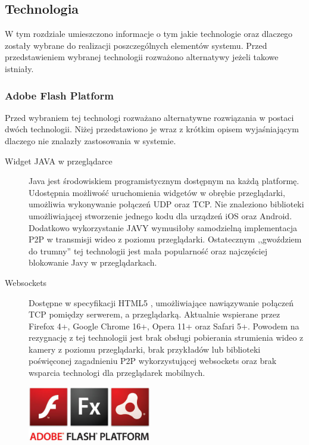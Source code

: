 \subsection{Technologia}
\label{sec:EtapItechnologia}

W tym rozdziale umieszczono informacje o tym jakie technologie oraz dlaczego zostały wybrane do realizacji poszczególnych elementów systemu. Przed przedstawieniem wybranej technologii rozważono alternatywy jeżeli takowe istniały.

\subsubsection{Adobe Flash Platform}
\label{sec:EtapItechnologiaAFP}

Przed wybraniem tej technologi rozważano alternatywne rozwiązania w postaci dwóch technologii. Niżej przedstawiono je wraz z krótkim opisem wyjaśniającym dlaczego nie znalazły zastosowania w systemie.
\begin{description}
    \item[Widget JAVA w przeglądarce] Java jest środowiskiem programistycznym dostępnym na każdą platformę. Udostępnia możliwość uruchomienia widgetów w obrębie przeglądarki, umożliwia wykonywanie połączeń UDP oraz TCP. Nie znaleziono biblioteki umożliwiającej stworzenie jednego kodu dla urządzeń iOS oraz Android. Dodatkowo wykorzystanie JAVY wymusiłoby samodzielną implementacja P2P w transmisji wideo z poziomu przeglądarki. Ostatecznym ,,gwoździem do trumny'' tej technologii jest mała popularność oraz najczęściej blokowanie Javy w przeglądarkach.
    \item[Websockets] Dostępne w specyfikacji HTML5 \cite{rfc6455}, umożliwiające nawiązywanie połączeń TCP pomiędzy serwerem, a przeglądarką. Aktualnie wspierane przez  Firefox 4+, Google Chrome 16+, Opera 11+ oraz Safari 5+. Powodem na rezygnację z tej technologii jest brak obsługi pobierania strumienia wideo z kamery z poziomu przeglądarki, brak przykładów lub biblioteki poświęconej zagadnieniu P2P wykorzystującej websockets oraz brak wsparcia technologi dla przeglądarek mobilnych.
\end{description}

\begin{figure}
  \begin{center}
    \includegraphics[width=0.48\textwidth]{img/logos/adobe-flash-platform.jpg}
  \end{center}
\end{figure}

